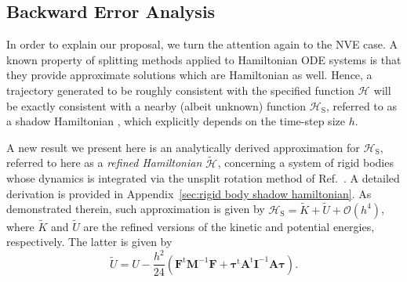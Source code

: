 \documentclass[
journal=jctcce,
layout=twocolumn
]{achemso}
\newcommand{\mt}[1]{\boldsymbol{\mathbf{#1}}}   %
\newcommand{\vt}[1]{\boldsymbol{\mathbf{#1}}}   %
\newcommand{\tr}[1]{#1^\text{t}}                %
\newcommand{\Ham}[1]{{\mathcal H}_\text{#1}}    %
\newcommand{\timestep}{h}
\newcommand{\refined}[1]{\widetilde{#1}}
\begin{document}
\subsection{Backward Error Analysis}
\label{sec:modified_h}

In order to explain our proposal, we turn the attention again to the NVE case.
A known property of splitting methods applied to Hamiltonian ODE systems is that they provide approximate solutions which are Hamiltonian as well.
Hence, a trajectory generated to be roughly consistent with the specified function $\Ham{}$ will be exactly consistent with a nearby (albeit unknown) function $\Ham{S}$, referred to as a shadow Hamiltonian \cite{Hairer_2006}, which explicitly depends on the time-step size $\timestep$.

A new result we present here is an analytically derived approximation for $\Ham{S}$, referred to here as a \textit{refined Hamiltonian} $\refined{\Ham{}}$, concerning a system of rigid bodies whose dynamics is integrated via the unsplit rotation method of Ref.~.
A detailed derivation is provided in Appendix~\ref{sec:rigid body shadow hamiltonian}.
As demonstrated therein, such approximation is given by $\Ham{S} = \refined K + \refined U + \mathcal{O}(h^4)$, where $\refined K$ and $\refined U$ are the refined versions of the kinetic and potential energies, respectively.
The latter is given by
\begin{equation}
\label{eq:modified potential energy}
\refined U = U - \frac{\timestep^2}{24} \left( \tr{\vt F} {\mt M}^{-1} {\vt F} + \tr{\vt \tau} \tr{\mt A} {\mt I}^{-1} {\mt A} {\vt \tau} \right).
\end{equation}
\end{document}
